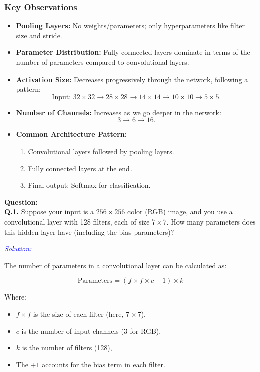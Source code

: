 \documentclass[letterpaper,12pt,notitlepage,twoside]{report}
\begin{document}
\FloatBarrier


\subsubsection*{Key Observations}
\begin{itemize}[nosep]
    \item \textbf{Pooling Layers:} No weights/parameters; only hyperparameters like filter size and stride.
    \item \textbf{Parameter Distribution:} Fully connected layers dominate in terms of the number of parameters compared to convolutional layers.
    \item \textbf{Activation Size:} Decreases progressively through the network, following a pattern:
    \[
    \text{Input: } 32 \times 32 \to 28 \times 28 \to 14 \times 14 \to 10 \times 10 \to 5 \times 5.
    \]
    \item \textbf{Number of Channels:} Increases as we go deeper in the network:
    \[
    3 \to 6 \to 16.
    \]
    \item \textbf{Common Architecture Pattern:}
    \begin{enumerate}
        \item Convolutional layers followed by pooling layers.
        \item Fully connected layers at the end.
        \item Final output: Softmax for classification.
    \end{enumerate}
\end{itemize}

\textbf{Question:} \\
\textbf{Q.1.} Suppose your input is a \( 256 \times 256 \) color (RGB) image, and you use a convolutional layer with 128 filters, each of size \( 7 \times 7 \). How many parameters does this hidden layer have (including the bias parameters)?

\textcolor{blue}{\textit{Solution:}}

The number of parameters in a convolutional layer can be calculated as:

\[
\text{Parameters} = (f \times f \times c + 1) \times k
\]

Where:
\begin{itemize}
    \item \( f \times f \) is the size of each filter (here, \( 7 \times 7 \)),
    \item \( c \) is the number of input channels (3 for RGB),
    \item \( k \) is the number of filters (128),
    \item The \( +1 \) accounts for the bias term in each filter.
\end{itemize}
\end{document}
